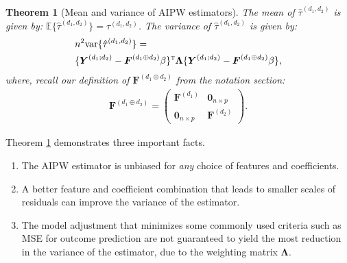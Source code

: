 \documentclass{article}
\theoremstyle{plain}
\newtheorem{theorem}{Theorem}[section]
\theoremstyle{definition}
\theoremstyle{remark}
\newcommand{\E}{\mathbb{E}}
\def\T{{\textsc{t}}}
\newcommand{\var}{\textup{var}}
\newcommand{\bY}{\boldsymbol{Y}}
\newcommand{\bF}{\boldsymbol{F}}
\newcommand{\bLambda}{\boldsymbol{\Lambda}}
\newcommand{\bZero}{\boldsymbol{0}}
\newcommand{\bFaug}{\bF^{(d_1\oplus d_2)}}
\begin{document}
\begin{theorem}[Mean and variance of AIPW estimators]\label{thm:mean_variance}
    The mean of $\hat\tau^{(d_1,d_2)}$ is given by: $
        \E\{\hat\tau^{(d_1, d_2)}\} = \tau^{(d_1,d_2)}$. 
    The variance of $\hat\tau^{(d_1,d_2)}$ is given by:
    {\small
    \begin{align}\label{eqn:var-compact}
        &n^2\var\{\hat\tau^{(d_1,d_2)}\} =  \notag\\
        &  
        \{\bY^{(d_1;d_2)}-\bFaug\beta\}^{\T} \bLambda\{\bY^{(d_1;d_2)}-\bFaug\beta\}, 
    \end{align}
    }
    where, recall our definition of $\bFaug$ from the notation section:  
    \begin{align}
        \bFaug = 
        \begin{pmatrix}
            \bF^{(d_1)} & \bZero_{n\times p} \\
            \bZero_{n\times p} & \bF^{(d_2)}
        \end{pmatrix}. \label{eq::bFaug}
    \end{align}
\end{theorem}
Theorem \ref{thm:mean_variance} demonstrates three important facts. 
\begin{enumerate}[label=(F\arabic*)]
    \item \label{item:fact1} The AIPW estimator is unbiased for \textit{any} choice of features and coefficients. 
    \item \label{item:fact2} A better feature and coefficient combination that leads to smaller scales of residuals can improve the variance of the estimator.   
    \item \label{item:fact3} The model adjustment that minimizes some commonly used criteria such as MSE for outcome prediction are not guaranteed to yield the most reduction in the variance of the estimator, due to the weighting matrix $\bLambda$. 
\end{enumerate}
\end{document}
